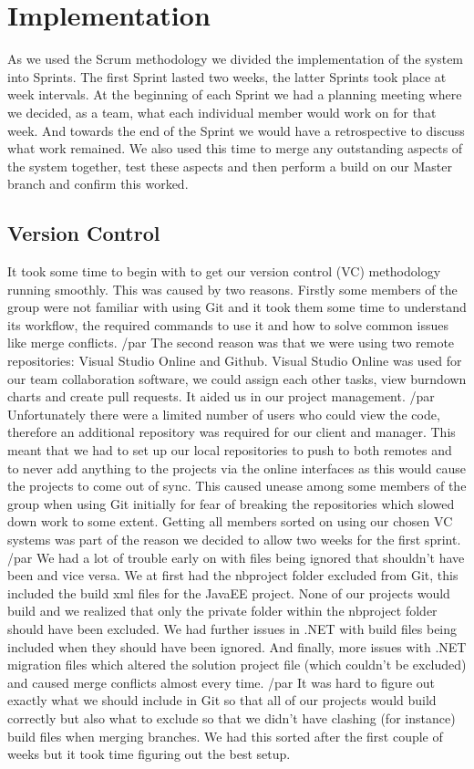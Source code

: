 \chapter{Implementation}

As we used the Scrum methodology we divided the implementation of the system into Sprints. The first Sprint lasted two weeks, the latter Sprints took place at week intervals. At the beginning of each Sprint we had a planning meeting where we decided, as a team, what each individual member would work on for that week. And towards the end of the Sprint we would have a retrospective to discuss what work remained. We also used this time to merge any outstanding aspects of the system together, test these aspects and then perform a build on our Master branch and confirm this worked.
\section{Version Control}
It took some time to begin with to get our version control (VC) methodology running smoothly. This was caused by two reasons. Firstly some members of the group were not familiar with using Git and it took them some time to understand its workflow, the required commands to use it and how to solve common issues like merge conflicts. /par
The second reason was that we were using two remote repositories: Visual Studio Online\cite{VSO} and Github\cite{Github}. Visual Studio Online was used for our team collaboration software, we could assign each other tasks, view burndown charts and create pull requests. It aided us in our project management. /par
Unfortunately there were a limited number of users who could view the code, therefore an additional repository was required for our client and manager. This meant that we had to set up our local repositories to push to both remotes and to never add anything to the projects via the online interfaces as this would cause the projects to come out of sync. This caused unease among some members of the group when using Git initially for fear of breaking the repositories which slowed down work to some extent. Getting all members sorted on using our chosen VC systems was part of the reason we decided to allow two weeks for the first sprint. /par
We had a lot of trouble early on with files being ignored that shouldn’t have been and vice versa. We at first had the nbproject folder excluded from Git, this included the build xml files for the JavaEE project. None of our projects would build and we realized that only the private folder within the nbproject folder should have been excluded. We had further issues in .NET with build files being included when they should have been ignored. And finally, more issues with .NET migration files which altered the solution project file (which couldn’t be excluded) and caused merge conflicts almost every time. /par
It was hard to figure out exactly what we should include in Git so that all of our projects would build correctly but also what to exclude so that we didn’t have clashing (for instance) build files when merging branches. We had this sorted after the first couple of weeks but it took time figuring out the best setup. 
